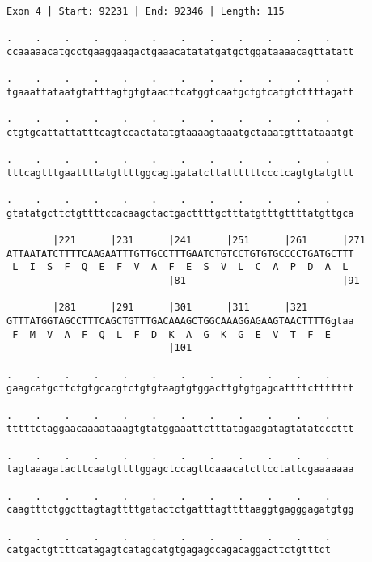 \documentclass{article}
\begin{document}
\begin{Verbatim}
Exon 4 | Start: 92231 | End: 92346 | Length: 115
 
.    .    .    .    .    .    .    .    .    .    .    .    
ccaaaaacatgcctgaaggaagactgaaacatatatgatgctggataaaacagttatatt
  
.    .    .    .    .    .    .    .    .    .    .    .    
tgaaattataatgtatttagtgtgtaacttcatggtcaatgctgtcatgtcttttagatt
  
.    .    .    .    .    .    .    .    .    .    .    .    
ctgtgcattattatttcagtccactatatgtaaaagtaaatgctaaatgtttataaatgt
  
.    .    .    .    .    .    .    .    .    .    .    .    
tttcagtttgaattttatgttttggcagtgatatcttattttttccctcagtgtatgttt
  
.    .    .    .    .    .    .    .    .    .    .    .    
gtatatgcttctgttttccacaagctactgacttttgctttatgtttgttttatgttgca
  
        |221      |231      |241      |251      |261      |271
ATTAATATCTTTTCAAGAATTTGTTGCCTTTGAATCTGTCCTGTGTGCCCCTGATGCTTT
 L  I  S  F  Q  E  F  V  A  F  E  S  V  L  C  A  P  D  A  L 
                            |81                           |91
  
        |281      |291      |301      |311      |321        
GTTTATGGTAGCCTTTCAGCTGTTTGACAAAGCTGGCAAAGGAGAAGTAACTTTTGgtaa
 F  M  V  A  F  Q  L  F  D  K  A  G  K  G  E  V  T  F  E    
                            |101                            
  
.    .    .    .    .    .    .    .    .    .    .    .    
gaagcatgcttctgtgcacgtctgtgtaagtgtggacttgtgtgagcattttcttttttt
  
.    .    .    .    .    .    .    .    .    .    .    .    
tttttctaggaacaaaataaagtgtatggaaattctttatagaagatagtatatcccttt
  
.    .    .    .    .    .    .    .    .    .    .    .    
tagtaaagatacttcaatgttttggagctccagttcaaacatcttcctattcgaaaaaaa
  
.    .    .    .    .    .    .    .    .    .    .    .    
caagtttctggcttagtagttttgatactctgatttagttttaaggtgagggagatgtgg
  
.    .    .    .    .    .    .    .    .    .    .    .
catgactgttttcatagagtcatagcatgtgagagccagacaggacttctgtttct
\end{Verbatim}
\newpage
\end{document}

